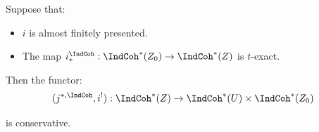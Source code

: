 \begin{lem}
\notready\label{l:coh-supp}

Suppose that:

\begin{itemize}

\item $i$ is almost finitely presented.

\item The map $i_*^{\IndCoh}:\IndCoh^*(Z_0) \to \IndCoh^*(Z)$ is $t$-exact.

\end{itemize}

 Then the functor:
%
\[
(j^{*,\IndCoh},i^!):\IndCoh^*(Z) \to \IndCoh^*(U) \times \IndCoh^*(Z_0)
\]

 is conservative.

\end{lem}

